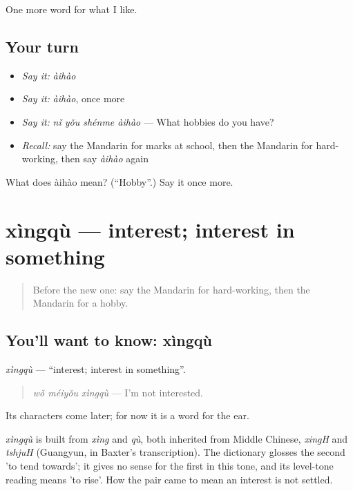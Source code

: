 \begin{grammarlens}[title={What you've built}]
One more word for what I like.
\end{grammarlens}

\subsection*{Your turn}
\begin{itemize}
\raggedright
  \item \emph{Say it:} \emph{àihào}
  \item \emph{Say it:} \emph{àihào}, once more
  \item \emph{Say it:} \emph{nǐ yǒu shénme àihào} — What hobbies do you have?
  \item \emph{Recall:} say the Mandarin for marks at school, then the Mandarin for hard-working, then say \emph{àihào} again
\end{itemize}

\begin{tcolorbox}[breakable,colback=teal!4,colframe=teal!35!black,title={Before you move on}]
What does àihào mean? (\textquotedblleft{}Hobby\textquotedblright{}.) Say it once more.
\end{tcolorbox}
\section[xìngqù]{xìngqù — interest; interest in something}

\label{lesson:ZH-C250-xingqu}



\begin{quote}
Before the new one: say the Mandarin for hard-working, then the Mandarin for a hobby.
\end{quote}

\subsection*{You'll want to know: xìngqù}
\emph{xìngqù} — \textquotedblleft{}interest; interest in something\textquotedblright{}.

\begin{quote}
\emph{wǒ méiyǒu xìngqù} — I'm not interested.
\end{quote}

Its characters come later; for now it is a word for the ear.

\begin{cousinweb}
\emph{xìngqù} is built from \emph{xìng} and \emph{qù}, both inherited from Middle Chinese, \emph{xingH} and \emph{tshjuH} (Guangyun, in Baxter's transcription). The dictionary glosses the second 'to tend towards'; it gives no sense for the first in this tone, and its level-tone reading means 'to rise'. How the pair came to mean an interest is not settled.
\end{cousinweb}

